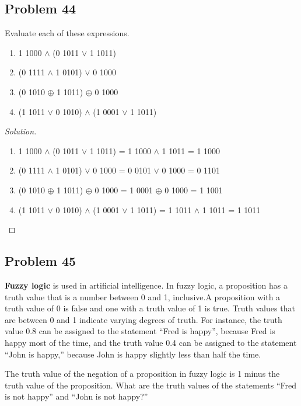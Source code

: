\documentclass{article}
\newenvironment{solution}{\renewcommand\qedsymbol{}\begin{proof}[Solution]}{\end{proof}}
\begin{document}
\clearpage
\subsection*{Problem 44}
Evaluate each of these expressions.
\begin{enumerate}[leftmargin=16pt, topsep = 8pt]
\item 1 1000 $\land$ (0 1011 $\lor$ 1 1011)
\item (0 1111 $\land$ 1 0101) $\lor$ 0 1000
\item (0 1010 $\oplus$ 1 1011) $\oplus$ 0 1000
\item (1 1011 $\lor$ 0 1010) $\land$ (1 0001 $\lor$ 1 1011)
\end{enumerate}

\begin{solution}
\hspace{1pt}

\begin{enumerate}[leftmargin=16pt, topsep = 8pt]
\item 1 1000 $\land$ (0 1011 $\lor$ 1 1011) = 1 1000 $\land$ 1 1011 = 1 1000
\item (0 1111 $\land$ 1 0101) $\lor$ 0 1000 = 0 0101 $\lor$ 0 1000 = 0 1101
\item (0 1010 $\oplus$ 1 1011) $\oplus$ 0 1000 = 1 0001 $\oplus$ 0 1000 = 1 1001
\item (1 1011 $\lor$ 0 1010) $\land$ (1 0001 $\lor$ 1 1011) = 1 1011 $\land$ 1 1011 = 1 1011
\end{enumerate}
\end{solution}
\subsection*{Problem 45}
\textbf{Fuzzy logic} is used in artificial intelligence. In fuzzy logic, a proposition has a truth value that is a number between 0 and 1, inclusive.A proposition with a truth value of 0 is false and one with a truth value of 1 is true. Truth values that are between 0 and 1 indicate varying degrees of truth. For instance, the truth value 0.8 can be assigned to the statement “Fred is happy”, because Fred is happy most of the time, and the truth value 0.4 can be assigned to the statement “John is happy,” because John is happy slightly less than half the time.

\noindent
The truth value of the negation of a proposition in fuzzy logic is 1 minus the truth value of the proposition. What are the truth values of the statements “Fred is not happy” and “John is not happy?”
\end{document}
